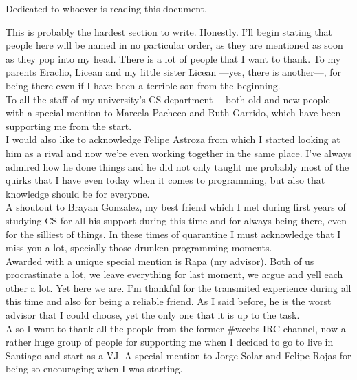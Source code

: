 
\begin{dedicatory}
    Dedicated to whoever is reading this document.
\end{dedicatory}

\begin{acknowledgment}
This is probably the hardest section to write. Honestly. I'll begin stating that people here will be named in no particular order, as they are mentioned as soon as they pop into my head. There is a lot of people that I want to thank. To my parents Eraclio, Licean and my little sister Licean ---yes, there is another---, for being there even if I have been a terrible son from the beginning. \\

To all the staff of my university's  CS department ---both old and new people--- with a special mention to Marcela Pacheco and Ruth Garrido, which have been supporting me from the start. \\

I would also like to acknowledge Felipe Astroza from which I started looking at him as a rival and now we're even working together in the same place. I've always admired how he done things and he did not only taught me probably most of the quirks that I have even today when it comes to programming, but also that knowledge should be for everyone.\\

A shoutout to Brayan Gonzalez, my best friend which I met during first years of studying CS for all his support during this time and for always being there, even for the silliest of things. In these times of quarantine I must acknowledge that I miss you a lot, specially those drunken programming moments.\\

Awarded with a unique special mention is Rapa (my advisor). Both of us procrastinate a lot, we leave everything for last moment, we argue and yell each other a lot. Yet here we are. I'm thankful for the transmited experience during all this time and also for being a reliable friend. As I said before, he is the worst advisor that I could choose, yet the only one that it is up to the task.\\

Also I want to thank all the people from the former \#weebs IRC channel, now a rather huge group of people for supporting me when I decided to go to live in Santiago and start as a VJ. A special mention to Jorge Solar and Felipe Rojas for being so encouraging when I was starting.\\


\end{acknowledgment}
